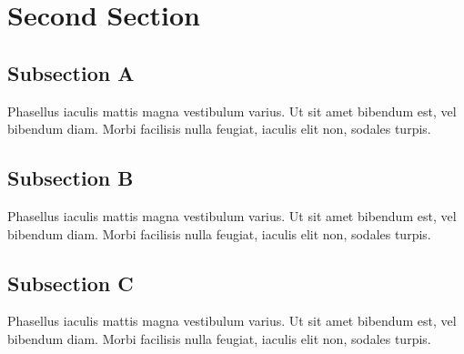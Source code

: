 \par\section{Second Section}
\par\subsection{Subsection A}
\par\noindent Phasellus iaculis mattis magna vestibulum varius. Ut sit amet bibendum est, vel bibendum diam. Morbi facilisis nulla feugiat, iaculis elit non, sodales turpis.
\par\subsection{Subsection B}
\par\noindent Phasellus iaculis mattis magna vestibulum varius. Ut sit amet bibendum est, vel bibendum diam. Morbi facilisis nulla feugiat, iaculis elit non, sodales turpis.
\par\subsection{Subsection C}
\par\noindent Phasellus iaculis mattis magna vestibulum varius. Ut sit amet bibendum est, vel bibendum diam. Morbi facilisis nulla feugiat, iaculis elit non, sodales turpis.